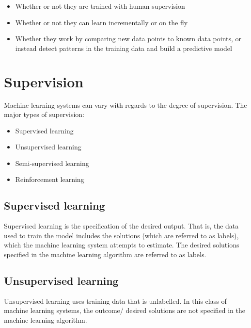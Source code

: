 \documentclass[]{book}
\providecommand{\tightlist}{%
  \setlength{\itemsep}{0pt}\setlength{\parskip}{0pt}}
\begin{document}
\begin{itemize}
\tightlist
\item
  Whether or not they are trained with human supervision\\
\item
  Whether or not they can learn incrementally or on the fly\\
\item
  Whether they work by comparing new data points to known data points,
  or instead detect patterns in the training data and build a predictive
  model
\end{itemize}

\section{Supervision}\label{supervision}

Machine learning systems can vary with regards to the degree of
supervision. The major types of supervision:

\begin{itemize}
\tightlist
\item
  Supervised learning\\
\item
  Unsupervised learning\\
\item
  Semi-supervised learning\\
\item
  Reinforcement learning
\end{itemize}

\subsection{Supervised learning}\label{supervised-learning}

Supervised learning is the specification of the desired output. That is,
the data used to train the model includes the solutions (which are
referred to as labels), which the machine learning system attempts to
estimate. The desired solutions specified in the machine learning
algorithm are referred to as labels.

\subsection{Unsupervised learning}\label{unsupervised-learning}

Unsupervised learning uses training data that is unlabelled. In this
class of machine learning systems, the outcome/ desired solutions are
not specified in the machine learning algorithm.
\end{document}
